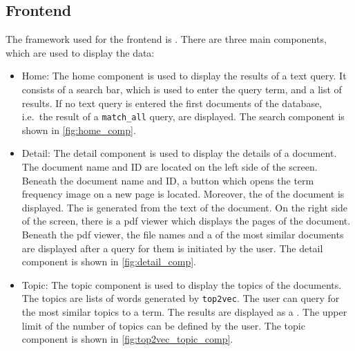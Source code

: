 




\subsection{Frontend}\label{subsec:frontend}

The framework used for the frontend is \angular{}.
There are three main components, which are used to display the data:

\begin{itemize}
    \item \label{pt:home}Home: 
        The home component is used to display the results of a text query.
        It consists of a search bar, which is used to enter the query term, and a list of results.
        If no text query is entered the first documents of the database, i.e.\ the result of a \texttt{match\_all} query, are displayed.
        The search component is shown in \autoref{fig:home_comp}.

    \item \label{pt:detail}Detail: 
        The detail component is used to display the details of a document.
        The document name and ID are located on the left side of the screen.
        Beneath the document name and ID, a button which opens the term frequency image on a new page is located. 
        Moreover, the \wordcloud{} of the document is displayed.
        The \wordcloud{} is generated from the text of the document.
        On the right side of the screen, there is a \ac{pdf} viewer which displays the pages of the document.
        Beneath the \ac{pdf} viewer, the file names and a \wordcloud{} of the most similar documents are displayed after a query for them is initiated by the user.
        The detail component is shown in \autoref{fig:detail_comp}.

    \item \label{pt:topic}Topic: 
        The topic component is used to display the topics of the documents.
        The topics are lists of words generated by \texttt{top2vec}.
        The user can query for the most similar topics to a term.
        The results are displayed as a \wordcloud{}.
        The upper limit of the number of topics can be defined by the user.
        The topic component is shown in \autoref{fig:top2vec_topic_comp}.
\end{itemize}


